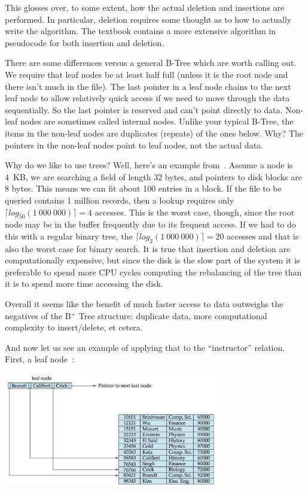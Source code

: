 This glosses over, to some extent, how the actual deletion and insertions are performed. In particular, deletion requires some thought as to how to actually write the algorithm. The textbook contains a more extensive algorithm in pseudocode for both insertion and deletion.

There are some differences versus a general B-Tree which are worth calling out. We require that leaf nodes be at least half full (unless it is the root node and there isn't much in the file). The last pointer in a leaf node chains to the next leaf node to allow relatively quick access if we need to move through the data sequentially. So the last pointer is reserved and can't point directly to data. Non-leaf nodes are sometimes called internal nodes. Unlike your typical B-Tree, the items in the non-leaf nodes are duplicates (repeats) of the ones below. Why? The pointers in the non-leaf nodes point to leaf nodes, not the actual data.

Why do we like to use trees? Well, here's an example from~\cite{dsc}. Assume a node is 4~KB, we are searching a field of length 32 bytes, and pointers to disk blocks are 8 bytes. This means we can fit about 100 entries in a block. If the file to be queried contains 1 million records, then a lookup requires only $\lceil log_{50}(1~000~000) \rceil = 4$ accesses. This is the worst case, though, since the root node may be in the buffer frequently due to its frequent access. If we had to do this with a regular binary tree, the $\lceil log_{2}(1~000~000) \rceil = 20$ accesses and that is also the worst case for binary search. It is true that insertion and deletion are computationally expensive, but since the disk is the slow part of the system it is preferable to spend more CPU cycles computing the rebalancing of the tree than it is to spend more time accessing the disk. 

Overall it seems like the benefit of much faster access to data outweighs the negatives of the B$^{+}$ Tree structure: duplicate data, more computational complexity to insert/delete, et cetera.

And now let us see an example of applying that to the ``instructor'' relation. First, a leaf node~\cite{dsc}:

\begin{center}
	\includegraphics[width=0.7\textwidth]{images/b-tree-instructor.png}
\end{center}

